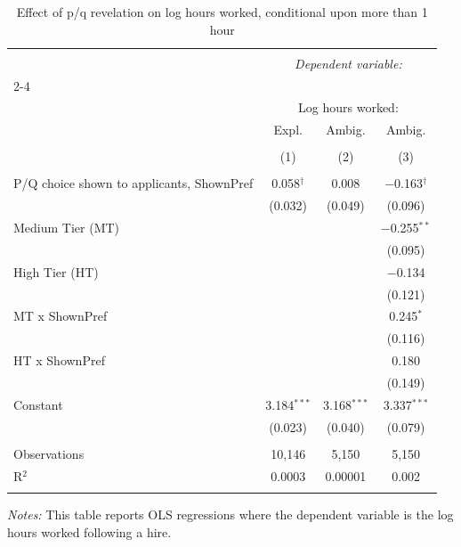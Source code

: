 
\begin{table}[!htbp] \centering 
  \caption{Effect of p/q revelation on log hours worked, conditional upon more than 1 hour} 
  \label{tab:hours} 
\small 
\begin{tabular}{@{\extracolsep{5pt}}lccc} 
\\[-1.8ex]\hline 
\hline \\[-1.8ex] 
 & \multicolumn{3}{c}{\textit{Dependent variable:}} \\ 
\cline{2-4} 
\\[-1.8ex] & \multicolumn{3}{c}{Log hours worked:} \\ 
 & Expl. & Ambig. & Ambig. \\ 
\\[-1.8ex] & (1) & (2) & (3)\\ 
\hline \\[-1.8ex] 
 P/Q choice shown to applicants, ShownPref & 0.058$^{\dagger}$ & 0.008 & $-$0.163$^{\dagger}$ \\ 
  & (0.032) & (0.049) & (0.096) \\ 
  Medium Tier (MT) &  &  & $-$0.255$^{**}$ \\ 
  &  &  & (0.095) \\ 
  High Tier (HT) &  &  & $-$0.134 \\ 
  &  &  & (0.121) \\ 
  MT x ShownPref &  &  & 0.245$^{*}$ \\ 
  &  &  & (0.116) \\ 
  HT x ShownPref &  &  & 0.180 \\ 
  &  &  & (0.149) \\ 
  Constant & 3.184$^{***}$ & 3.168$^{***}$ & 3.337$^{***}$ \\ 
  & (0.023) & (0.040) & (0.079) \\ 
 \hline \\[-1.8ex] 
Observations & 10,146 & 5,150 & 5,150 \\ 
R$^{2}$ & 0.0003 & 0.00001 & 0.002 \\ 
\hline 
\hline \\[-1.8ex] 
\end{tabular}
\begin{minipage}{0.9\textwidth} 
 \emph{Notes:} This table reports OLS regressions where the dependent variable is the log hours worked following a hire.
\starlanguage
 \end{minipage}
\end{table}
